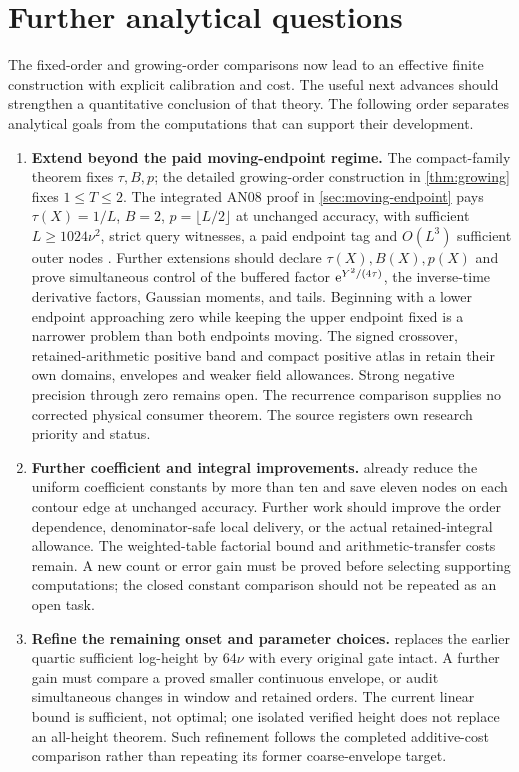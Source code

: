 \section{Further analytical questions}
\label{sec:outstanding}
The fixed-order and growing-order comparisons now lead to an effective
finite construction with explicit calibration and cost. The useful next
advances should strengthen a quantitative conclusion of that theory.
The following order separates analytical goals from the computations
that can support their development.

\begin{enumerate}[leftmargin=*,itemsep=.65em]
\item \textbf{Extend beyond the paid moving-endpoint regime.}
The compact-family theorem fixes \(\tau,B,p\); the detailed growing-order
construction in \cref{thm:growing} fixes \(1\le T\le2\).
The integrated AN08 proof in \cref{sec:moving-endpoint} pays
\(\tau(X)=1/L\), \(B=2\), \(p=\lfloor L/2\rfloor\) at unchanged
accuracy, with sufficient \(L\ge1024\nu^2\), strict query witnesses,
a paid endpoint tag and \(O(L^3)\) sufficient outer nodes
\cite{rec20,rec20review}. Further extensions should declare
\(\tau(X),B(X),p(X)\) and prove simultaneous control of the buffered
factor \(\mathrm e^{Y^2/(4\tau)}\), the inverse-time derivative factors,
Gaussian moments, and tails. Beginning with a lower endpoint approaching
zero while keeping the upper endpoint fixed is a narrower problem than
both endpoints moving. The signed crossover, retained-arithmetic positive band and compact
positive atlas in \cite{ansatzcomp} retain their own domains, envelopes
and weaker field allowances. Strong negative precision through zero
remains open. The recurrence comparison supplies no corrected physical
consumer theorem. The source registers own research priority and status.


\item \textbf{Further coefficient and integral improvements.}
 already reduce the uniform
coefficient constants by more than ten and save eleven nodes on each
contour edge at unchanged accuracy. Further work should improve the
order dependence, denominator-safe local delivery, or the actual
retained-integral allowance. The weighted-table factorial bound and
arithmetic-transfer costs remain. A new count or error gain must be
proved before selecting supporting computations; the closed constant
comparison should not be repeated as an open task.

\item \textbf{Refine the remaining onset and parameter choices.}
 replaces the earlier quartic sufficient
log-height by \(64\nu\) with every original gate intact. A further gain
must compare a proved smaller continuous envelope, or audit simultaneous
changes in window and retained orders. The current linear bound is
sufficient, not optimal; one isolated verified height does not replace
an all-height theorem. Such refinement follows the completed additive-cost
comparison rather than repeating its former coarse-envelope target.


\end{enumerate}
